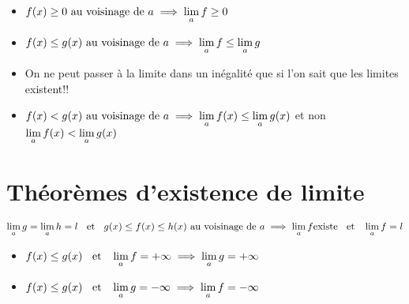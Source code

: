\begin{prp} 
\begin{itemize}
\item $f(x) \geq 0 \text{ au voisinage de }a \implies \lim\limits_a f \geq 0$
\item $f(x) \leq g(x) \text{ au voisinage de }a \implies
\lim\limits_a f \leq \lim\limits_a g$
\end{itemize}
\end{prp}

\begin{rem} 
\begin{itemize}
    \item 
    \begin{att}
    On ne peut passer à la limite dans un inégalité que si l'on
    sait que les limites existent!!
    \end{att}
    \item
    \begin{att}
    $f(x) < g(x) \text{ au voisinage de }a \implies \lim\limits_a f(x) \leq \lim\limits_a g(x)$
    et non \\ $\lim\limits_a f(x) < \lim\limits_a g(x)$
    \end{att}
\end{itemize}
\end{rem}

\section{Théorèmes d'existence de limite}

\begin{thm}[d'encadrement]
$\lim\limits_a g = \lim\limits_a h = l \;\;\text{ et }\;\; g(x) \leq f(x) \leq h(x) \text{ au voisinage de }a
\implies \lim\limits_a f \text{existe} \\ \;\;\text{ et }\;\; \lim\limits_a f = l$
\end{thm}

\begin{thm}[de comparaison]
\begin{itemize}
    \item $f(x) \leq g(x) \;\;\text{ et }\;\; \lim\limits_a f = +\infty 
    \implies \lim\limits_a g = +\infty$
    \item $f(x) \leq g(x) \;\;\text{ et }\;\; \lim\limits_a g = -\infty 
    \implies \lim\limits_a f = -\infty$
\end{itemize}
\end{thm}

\pagebreak

